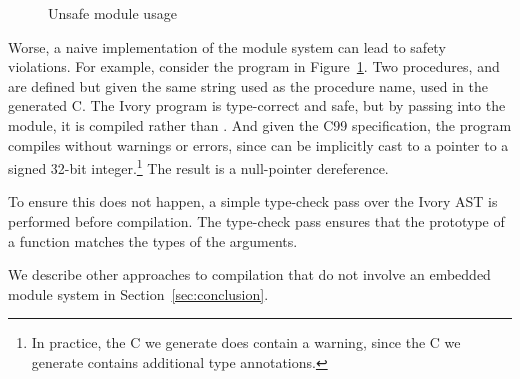 \begin{figure}[h]
\caption{Unsafe module usage}
\label{fig:unsafe-module}
\end{figure}

Worse, a naive implementation of the module system can lead to safety
violations. For example, consider the program in
Figure~\ref{fig:unsafe-module}. Two procedures,  and 
are defined but given the same string used as the procedure name, used in the
generated C. The Ivory program is type-correct and safe, but by passing
 into the module, it is compiled rather than . And given
the C99 specification, the program compiles without warnings or errors, since
 can be implicitly cast to a pointer to a signed 32-bit
integer.\footnote{In practice, the C we generate does contain a warning, since
  the C we generate contains additional type annotations.} The result is a
null-pointer dereference.

To ensure this does not happen, a simple type-check pass over the Ivory AST is
performed before compilation. The type-check pass ensures that the prototype of
a function matches the types of the arguments.

We describe other approaches to compilation that do not involve an embedded
module system in Section~\ref{sec:conclusion}.







